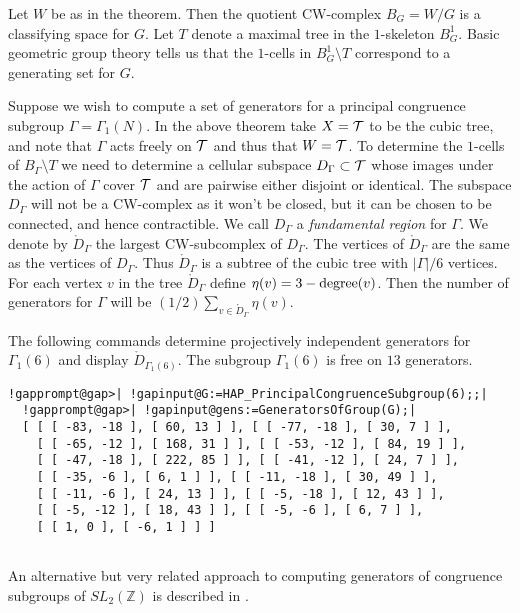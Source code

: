 \documentclass[a4paper,11pt]{report}
\begin{document}
{{ 

Let $W$ be as in the theorem. Then the quotient CW-complex $B_G=W/G$ is a classifying space for $G$. Let $T$ denote a maximal tree in the $1$-skeleton $B^1_G$. Basic geometric group theory tells us that the $1$-cells in $B^1_G\setminus T$ correspond to a generating set for $G$. 

 Suppose we wish to compute a set of generators for a principal congruence
subgroup $\Gamma=\Gamma_1(N)$. In the above theorem take $X={\cal T}$ to be the cubic tree, and note that $\Gamma$ acts freely on $\cal T$ and thus that $W={\cal T}$. To determine the $1$-cells of $B_{\Gamma}\setminus T$ we need to determine a cellular subspace $D_\Gamma \subset \cal T$ whose images under the action of $\Gamma$ cover $\cal T$ and are pairwise either disjoint or identical. The subspace $D_\Gamma$ will not be a CW-complex as it won't be closed, but it can be chosen to be
connected, and hence contractible. We call $D_\Gamma$ a \emph{fundamental region} for $\Gamma$. We denote by $\mathring D_\Gamma$ the largest CW-subcomplex of $D_\Gamma$. The vertices of $\mathring D_\Gamma$ are the same as the vertices of $D_\Gamma$. Thus $\mathring D_\Gamma$ is a subtree of the cubic tree with $|\Gamma|/6$ vertices. For each vertex $v$ in the tree $\mathring D_\Gamma$ define $\eta(v)=3 -{\rm degree}(v)$. Then the number of generators for $ \Gamma $ will be $(1/2)\sum_{v\in \mathring D_\Gamma} \eta(v)$. 

 The following commands determine projectively independent generators for $\Gamma_1(6)$ and display $\mathring D_{\Gamma_1(6)}$. The subgroup $\Gamma_1(6)$ is free on $13$ generators. 
\begin{Verbatim}[commandchars=!@|,fontsize=\small,frame=single,label=Example]
  !gapprompt@gap>| !gapinput@G:=HAP_PrincipalCongruenceSubgroup(6);;|
  !gapprompt@gap>| !gapinput@gens:=GeneratorsOfGroup(G);|
  [ [ [ -83, -18 ], [ 60, 13 ] ], [ [ -77, -18 ], [ 30, 7 ] ], 
    [ [ -65, -12 ], [ 168, 31 ] ], [ [ -53, -12 ], [ 84, 19 ] ], 
    [ [ -47, -18 ], [ 222, 85 ] ], [ [ -41, -12 ], [ 24, 7 ] ], 
    [ [ -35, -6 ], [ 6, 1 ] ], [ [ -11, -18 ], [ 30, 49 ] ], 
    [ [ -11, -6 ], [ 24, 13 ] ], [ [ -5, -18 ], [ 12, 43 ] ], 
    [ [ -5, -12 ], [ 18, 43 ] ], [ [ -5, -6 ], [ 6, 7 ] ], 
    [ [ 1, 0 ], [ -6, 1 ] ] ]
  
\end{Verbatim}
 

  

An alternative but very related approach to computing generators of congruence
subgroups of $SL_2(\mathbb Z)$ is described in \cite{kulkarni}. 

}}
\end{document}
